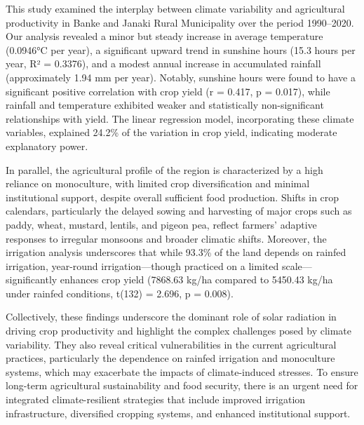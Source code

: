 

This study examined the interplay between climate variability and agricultural productivity in Banke and Janaki Rural Municipality over the period 1990–2020. Our analysis revealed a minor but steady increase in average temperature (0.0946°C per year), a significant upward trend in sunshine hours (15.3 hours per year, R² = 0.3376), and a modest annual increase in accumulated rainfall (approximately 1.94 mm per year). Notably, sunshine hours were found to have a significant positive correlation with crop yield (r = 0.417, p = 0.017), while rainfall and temperature exhibited weaker and statistically non-significant relationships with yield. The linear regression model, incorporating these climate variables, explained 24.2\% of the variation in crop yield, indicating moderate explanatory power.

In parallel, the agricultural profile of the region is characterized by a high reliance on monoculture, with limited crop diversification and minimal institutional support, despite overall sufficient food production. Shifts in crop calendars, particularly the delayed sowing and harvesting of major crops such as paddy, wheat, mustard, lentils, and pigeon pea, reflect farmers' adaptive responses to irregular monsoons and broader climatic shifts. Moreover, the irrigation analysis underscores that while 93.3\% of the land depends on rainfed irrigation, year-round irrigation—though practiced on a limited scale—significantly enhances crop yield (7868.63 kg/ha compared to 5450.43 kg/ha under rainfed conditions, t(132) = 2.696, p = 0.008).

Collectively, these findings underscore the dominant role of solar radiation in driving crop productivity and highlight the complex challenges posed by climate variability. They also reveal critical vulnerabilities in the current agricultural practices, particularly the dependence on rainfed irrigation and monoculture systems, which may exacerbate the impacts of climate-induced stresses. To ensure long-term agricultural sustainability and food security, there is an urgent need for integrated climate-resilient strategies that include improved irrigation infrastructure, diversified cropping systems, and enhanced institutional support.
